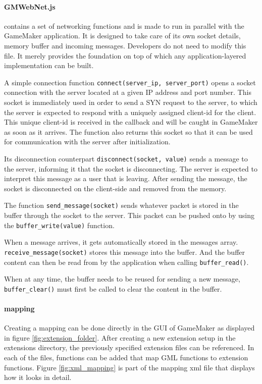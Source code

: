 \documentclass[bsc,frontabs,twoside,singlespacing,parskip,deptreport]{infthesis}     %
\begin{document}
\paragraph*{GMWebNet.js}
contains a set of networking functions and is made to run in parallel with the GameMaker application. 
It is designed to take care of its own socket details, memory buffer and incoming messages. Developers do not need to modify this file. It merely provides the foundation on top of which any application-layered implementation can be built.

A simple connection function \texttt{connect(server\_ip, server\_port)} opens a socket connection with the server located at a given IP address and port number.
This socket is immediately used in order to send a SYN request to the server, to which the server is expected to respond with a uniquely assigned client-id for the client. This unique client-id is received in the callback and will be caught in GameMaker as soon as it arrives.
The function also returns this socket so that it can be used for communication with the server after initialization.

Its disconnection counterpart \texttt{disconnect(socket, value)} sends a message to the server, informing it that the socket is disconnecting. The server is expected to interpret this message as a user that is leaving.
After sending the message, the socket is disconnected on the client-side and removed from the memory.

The function \texttt{send\_message(socket)} sends whatever packet is stored in the buffer through the socket to the server.
This packet can be pushed onto by using the \texttt{buffer\_write(value)} function.

When a message arrives, it gets automatically stored in the messages array. \texttt{receive\_message(socket)} stores this message into the buffer. And the buffer content can then be read from by the application when calling \texttt{buffer\_read()}.

When at any time, the buffer needs to be reused for sending a new message, \texttt{buffer\_clear()} must first be called to clear the content in the buffer. 

\paragraph*{mapping}
Creating a mapping can be done directly in the GUI of GameMaker as displayed in figure \ref{fig:extension_folder}. After creating a new extension setup in the extensions directory, the previously specified extension files can be referenced. In each of the files, functions can be added that map GML functions to extension functions. Figure \ref{fig:xml_mapping} is part of the mapping xml file that displays how it looks in detail.
\end{document}
